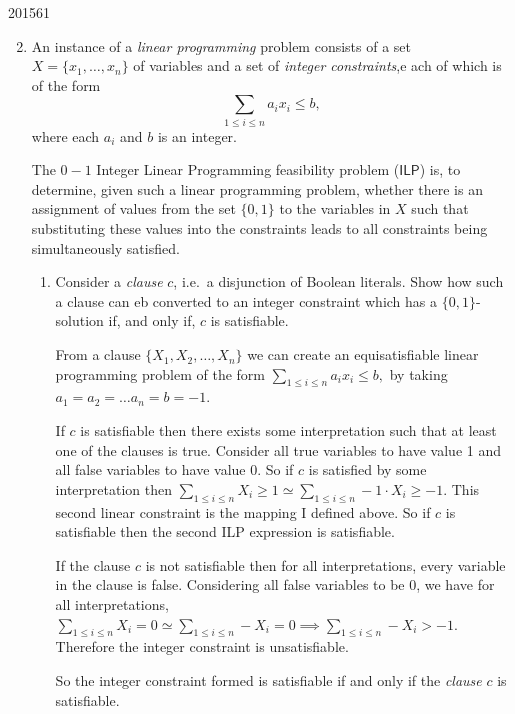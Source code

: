 \documentclass[10pt,\jkfside,a4paper]{article}
\begin{document}
\begin{examquestion}{2015}{6}{1}

\begin{enumerate}[label=(\alph*)]

\setcounter{enumi}{1}

\item An instance of a \textit{linear programming} problem consists of a set
$X = \{x_1, \dots, x_n\}$ of variables and a set of \textit{integer
constraints},e ach of which is of the form
\[
\sum_{1 \le i \le n} a_i x_i \le b,
\]
where each $a_i$ and $b$ is an integer.

The $0-1$ Integer Linear Programming feasibility problem ($\mathsf{ILP}$) is,
to determine, given such a linear programming problem, whether there is an
assignment of values from the set $\{0, 1\}$ to the variables in $X$ such that
substituting these values into the constraints leads to all constraints being
simultaneously satisfied.

\begin{enumerate}[label=(\roman*)]

\item Consider a \textit{clause} $c$, i.e.\ a disjunction of Boolean
literals. Show how such a clause can eb converted to an integer constraint
which has a $\{0, 1\}$-solution if, and only if, $c$ is satisfiable.

From a clause $\{X_1, X_2, \dots, X_n\}$ we can create an equisatisfiable
linear programming problem of the form $\sum_{1 \le i \le n} a_i x_i \le b,$
by taking $a_1 = a_2 = \dots a_n = b = -1$.

If $c$ is satisfiable then there exists some interpretation such that at
least one of the clauses is true. Consider all true variables to have value
1 and all false variables to have value 0. So if $c$ is satisfied by some
interpretation then $\sum_{1 \le i \le n } X_i \ge 1 \simeq \sum_{1 \le i \le n} -1 \cdot X_i \ge -1$.
This second linear constraint is the mapping I defined above. So if $c$ is
satisfiable then the second ILP expression is satisfiable.

If the clause $c$ is not satisfiable then for all interpretations, every
variable in the clause is false. Considering all false variables to be 0, we
have for all interpretations, $\sum_{1 \le i \le n} X_i = 0 \simeq \sum_{1 \le
i \le n} -X_i = 0 \implies \sum_{1 \le i \le n} -X_i > -1$.
Therefore the integer constraint is unsatisfiable.

So the integer constraint formed is satisfiable if and only if the
\textit{clause} $c$ is satisfiable.


\end{enumerate}
\end{enumerate}
\end{examquestion}
\end{document}
